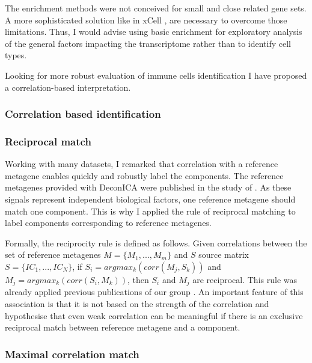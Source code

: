 \documentclass[12pt,]{book}
\theoremstyle{definition}
\theoremstyle{definition}
\theoremstyle{definition}
\theoremstyle{remark}
\begin{document}
The enrichment methods were not conceived for small and close related
gene sets. A more sophisticated solution like in xCell \citep{Aran2017},
are necessary to overcome those limitations. Thus, I would advise using
basic enrichment for exploratory analysis of the general factors
impacting the transcriptome rather than to identify cell types.

Looking for more robust evaluation of immune cells identification I have
proposed a correlation-based interpretation.

\hypertarget{correlation-based-identification}{%
\subsubsection{Correlation based
identification}\label{correlation-based-identification}}

\hypertarget{reciprocal-match}{%
\subsubsection{Reciprocal match}\label{reciprocal-match}}

Working with many datasets, I remarked that correlation with a reference
metagene enables quickly and robustly label the components. The
reference metagenes provided with DeconICA were published in the study
of \citet{Biton2014}. As these signals represent independent biological
factors, one reference metagene should match one component. This is why
I applied the rule of reciprocal matching to label components
corresponding to reference metagenes.

Formally, the reciprocity rule is defined as follows. Given correlations
between the set of reference metagenes \(M=\{M_{1},...,M_{m}\}\) and
\(S\) source matrix \(S=\{IC_{1},...,IC_{N}\}\), if
\(S_{i}=argmax_k (corr(M_{j},S_{k}))\) and
\(M_{j}=argmax_k (corr(S_{i},M_{k}))\), then \(S_{i}\) and \(M_{j}\) are
reciprocal. This rule was already applied previous publications of our
group \citep{Kairov2017, Czerwinska2018, Cantini2018}. An important
feature of this association is that it is not based on the strength of
the correlation and hypothesise that even weak correlation can be
meaningful if there is an exclusive reciprocal match between reference
metagene and a component.

\hypertarget{maximal-correlation-match}{%
\subsubsection{Maximal correlation
match}\label{maximal-correlation-match}}
\end{document}
